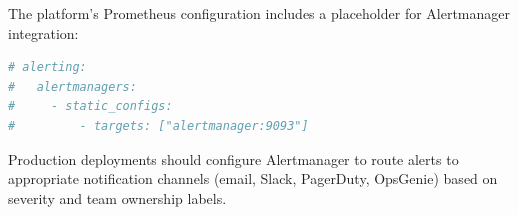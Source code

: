 The platform's Prometheus configuration includes a placeholder for Alertmanager integration:

\begin{lstlisting}[language=yaml, caption={Alertmanager configuration placeholder}]
# alerting:
#   alertmanagers:
#     - static_configs:
#         - targets: ["alertmanager:9093"]
\end{lstlisting}

Production deployments should configure Alertmanager to route alerts to appropriate notification channels (email, Slack, PagerDuty, OpsGenie) based on severity and team ownership labels.

